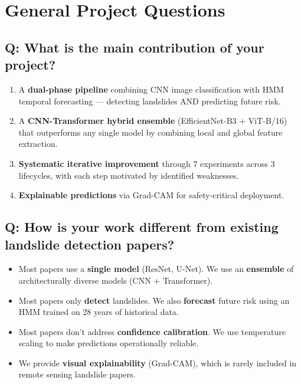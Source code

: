 \documentclass[11pt]{article}
\begin{document}
\section{General Project Questions}

\subsection{Q: What is the main contribution of your project?}

\begin{enumerate}[noitemsep]
    \item A \textbf{dual-phase pipeline} combining CNN image classification with HMM temporal forecasting --- detecting landslides AND predicting future risk.
    \item A \textbf{CNN-Transformer hybrid ensemble} (EfficientNet-B3 + ViT-B/16) that outperforms any single model by combining local and global feature extraction.
    \item \textbf{Systematic iterative improvement} through 7 experiments across 3 lifecycles, with each step motivated by identified weaknesses.
    \item \textbf{Explainable predictions} via Grad-CAM for safety-critical deployment.
\end{enumerate}

\subsection{Q: How is your work different from existing landslide detection papers?}

\begin{itemize}[noitemsep]
    \item Most papers use a \textbf{single model} (ResNet, U-Net). We use an \textbf{ensemble} of architecturally diverse models (CNN + Transformer).
    \item Most papers only \textbf{detect} landslides. We also \textbf{forecast} future risk using an HMM trained on 28 years of historical data.
    \item Most papers don't address \textbf{confidence calibration}. We use temperature scaling to make predictions operationally reliable.
    \item We provide \textbf{visual explainability} (Grad-CAM), which is rarely included in remote sensing landslide papers.
\end{itemize}
\end{document}

